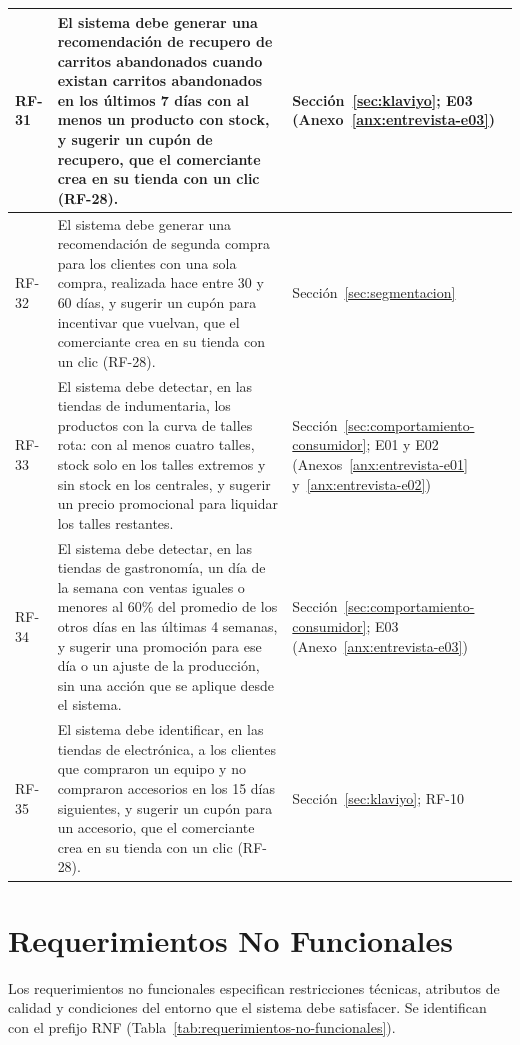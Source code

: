 \begin{longtable}{|m{1.7cm}|m{10.6cm}|m{2.7cm}|}
RF-31 & El sistema debe generar una recomendación de recupero de carritos abandonados cuando existan carritos abandonados en los últimos 7 días con al menos un producto con stock, y sugerir un cupón de recupero, que el comerciante crea en su tienda con un clic (RF-28). & Sección~\ref{sec:klaviyo}; E03 (Anexo~\ref{anx:entrevista-e03}) \\
\hline

RF-32 & El sistema debe generar una recomendación de segunda compra para los clientes con una sola compra, realizada hace entre 30 y 60 días, y sugerir un cupón para incentivar que vuelvan, que el comerciante crea en su tienda con un clic (RF-28). & Sección~\ref{sec:segmentacion} \\
\hline

RF-33 & El sistema debe detectar, en las tiendas de indumentaria, los productos con la curva de talles rota: con al menos cuatro talles, stock solo en los talles extremos y sin stock en los centrales, y sugerir un precio promocional para liquidar los talles restantes. & Sección~\ref{sec:comportamiento-consumidor}; E01 y E02 (Anexos~\ref{anx:entrevista-e01} y~\ref{anx:entrevista-e02}) \\
\hline

RF-34 & El sistema debe detectar, en las tiendas de gastronomía, un día de la semana con ventas iguales o menores al 60\% del promedio de los otros días en las últimas 4 semanas, y sugerir una promoción para ese día o un ajuste de la producción, sin una acción que se aplique desde el sistema. & Sección~\ref{sec:comportamiento-consumidor}; E03 (Anexo~\ref{anx:entrevista-e03}) \\
\hline

RF-35 & El sistema debe identificar, en las tiendas de electrónica, a los clientes que compraron un equipo y no compraron accesorios en los 15 días siguientes, y sugerir un cupón para un accesorio, que el comerciante crea en su tienda con un clic (RF-28). & Sección~\ref{sec:klaviyo}; RF-10 \\

\hline
\end{longtable}

\section{Requerimientos No Funcionales}
\label{sec:requerimientos-no-funcionales}

Los requerimientos no funcionales especifican restricciones técnicas, atributos de calidad y condiciones del entorno que el sistema debe satisfacer. Se identifican con el prefijo RNF (Tabla~\ref{tab:requerimientos-no-funcionales}).

